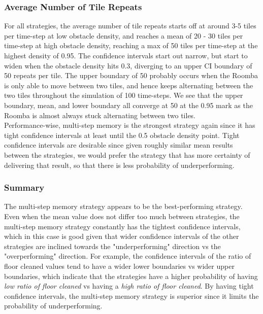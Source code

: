\documentclass[11pt]{article}
\begin{document}
\subsubsection*{Average Number of Tile Repeats}

For all strategies, the average number of tile repeats starts off at
around 3-5 tiles per time-step at low obstacle density, and reaches a
mean of 20 - 30 tiles per time-step at high obstacle density, reaching a
max of 50 tiles per time-step at the highest density of 0.95. The
confidence intervals start out narrow, but start to widen when the
obstacle density hits 0.3, diverging to an upper CI boundary of 50
repeats per tile. The upper boundary of 50 probably occurs when the
Roomba is only able to move between two tiles, and hence keeps
alternating between the two tiles throughout the simulation of 100
time-steps. We see that the upper boundary, mean, and lower boundary all
converge at 50 at the 0.95 mark as the Roomba is almost always stuck
alternating between two tiles.\\

Performance-wise, multi-step memory is the strongest strategy again
since it has tight confidence intervals at least until the 0.5 obstacle
density point. Tight confidence intervals are desirable since given
roughly similar mean results between the strategies, we would prefer the
strategy that has more certainty of delivering that result, so that
there is less probability of underperforming.

\subsubsection{Summary}

The multi-step memory strategy appears to be the best-performing
strategy. Even when the mean value does not differ too much between
strategies, the multi-step memory strategy constantly has the tightest
confidence intervals, which in this case is good given that wider
confidence intervals of the other strategies are inclined towards the
"underperforming" direction vs the "overperforming" direction. For
example, the confidence intervals of the ratio of floor cleaned values
tend to have a wider lower boundaries vs wider upper boundaries, which
indicate that the strategies have a higher probability of having
\emph{low ratio of floor cleaned} vs having a \emph{high ratio of floor
cleaned}. By having tight confidence intervals, the multi-step memory
strategy is superior since it limits the probability of underperforming.
\end{document}

